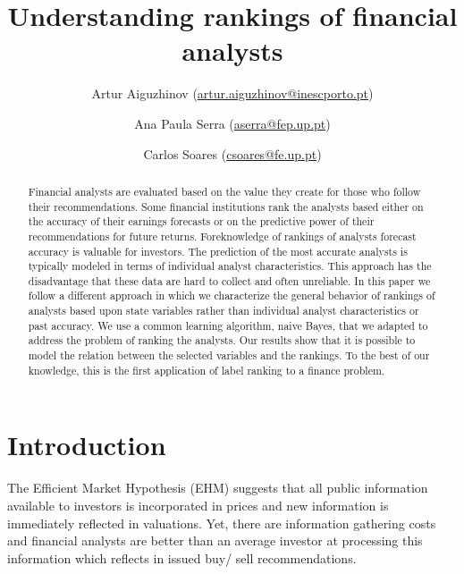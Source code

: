 \documentclass{article}\usepackage[]{graphicx}\usepackage[]{color}
\begin{document}
\title{Understanding rankings of financial analysts}


 \author[1,2]{ Artur Aiguzhinov (\href{mailto:artur.aiguzhinov@inescporto.pt}{artur.aiguzhinov@inescporto.pt})}
 \author[1]{ Ana Paula Serra (\href{mailto:aserra@fep.up.pt}{aserra@fep.up.pt})}
 \author[2,4]{Carlos Soares (\href{mailto:csoares@fe.up.pt}{csoares@fe.up.pt})}


        

\maketitle
\begin{abstract}

Financial analysts are evaluated based on the value they create for those who follow their recommendations. Some financial institutions rank the analysts based either on the accuracy of their earnings forecasts or on the predictive power of their recommendations for future returns. Foreknowledge of rankings of analysts forecast accuracy is valuable for investors. The prediction of the most accurate analysts is typically modeled in terms of individual analyst characteristics. This approach has the disadvantage that these data are hard to collect and often unreliable. In this paper we follow a different approach in which we characterize the general behavior of rankings of analysts based upon state variables rather than individual analyst characteristics or past accuracy. We use a common learning algorithm, naive Bayes, that we adapted to address the problem of ranking the analysts.  Our results show that it is possible to model the relation between the selected variables and the rankings. To the best of our knowledge, this is the first application of label ranking to a finance problem. 
\end{abstract}

\section{Introduction}
\label{sec:introduction}

The Efficient Market Hypothesis (EHM) \citep{fama1970ecm} suggests that all public information available to investors is incorporated in prices and new information is immediately reflected in valuations. Yet, there are information gathering costs and financial analysts are better than an average investor at processing this information which reflects in issued buy/ sell recommendations. 
\end{document}
